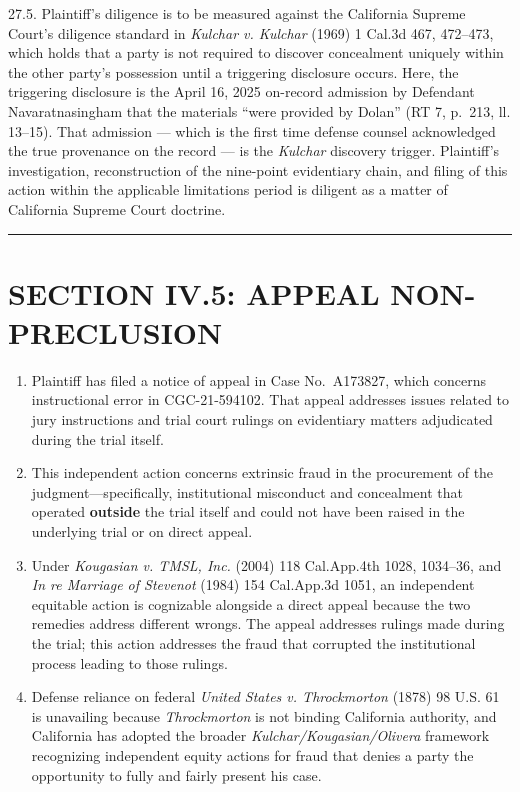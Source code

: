 27.5. Plaintiff's diligence is to be measured against the California Supreme Court's diligence standard in \emph{Kulchar v. Kulchar} (1969) 1 Cal.3d 467, 472--473, which holds that a party is not required to discover concealment uniquely within the other party's possession until a triggering disclosure occurs. Here, the triggering disclosure is the April 16, 2025 on-record admission by Defendant Navaratnasingham that the materials ``were provided by Dolan'' (RT 7, p.~213, ll. 13--15). That admission --- which is the first time defense counsel acknowledged the true provenance on the record --- is the \emph{Kulchar} discovery trigger. Plaintiff's investigation, reconstruction of the nine-point evidentiary chain, and filing of this action within the applicable limitations period is diligent as a matter of California Supreme Court doctrine.

\begin{center}\rule{0.5\linewidth}{0.5pt}\end{center}

\label{toc:section-iv5-appeal-nonpreclusion}
\section{SECTION IV.5: APPEAL NON-PRECLUSION}\label{section-iv.5-appeal-non-preclusion}

\begin{enumerate}
\def\labelenumi{\arabic{enumi}.}
\setcounter{enumi}{27}
\item
  Plaintiff has filed a notice of appeal in Case No.~A173827, which concerns instructional error in CGC-21-594102. That appeal addresses issues related to jury instructions and trial court rulings on evidentiary matters adjudicated during the trial itself.
\item
  This independent action concerns extrinsic fraud in the procurement of the judgment---specifically, institutional misconduct and concealment that operated \textbf{outside} the trial itself and could not have been raised in the underlying trial or on direct appeal.
\item
  Under \emph{Kougasian v. TMSL, Inc.} (2004) 118 Cal.App.4th 1028, 1034--36, and \emph{In re Marriage of Stevenot} (1984) 154 Cal.App.3d 1051, an independent equitable action is cognizable alongside a direct appeal because the two remedies address different wrongs. The appeal addresses rulings made during the trial; this action addresses the fraud that corrupted the institutional process leading to those rulings.
\item
  Defense reliance on federal \emph{United States v. Throckmorton} (1878) 98 U.S. 61 is unavailing because \emph{Throckmorton} is not binding California authority, and California has adopted the broader \emph{Kulchar/Kougasian/Olivera} framework recognizing independent equity actions for fraud that denies a party the opportunity to fully and fairly present his case.
\end{enumerate}

